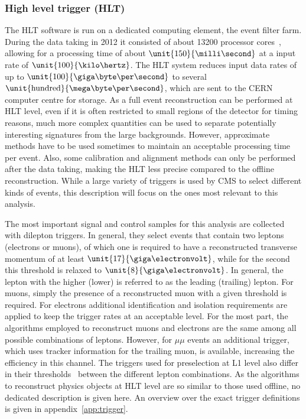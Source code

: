 \subsubsection*{High level trigger (HLT)}
The HLT software is run on a dedicated computing element, the event filter farm. During the data taking in 2012 it consisted of about 13200 processor cores~\cite{HLTProceedings}, allowing for a processing time of about $\unit{150}{\milli\second}$ at a input rate of $\unit{100}{\kilo\hertz}$. The HLT system reduces input data rates of up to $\unit{100}{\giga\byte\per\second}$ to several $\unit{\text{hundred}}{\mega\byte\per\second}$, which are sent to the CERN computer centre for storage. As a full event reconstruction can be performed at HLT level, even if it is often restricted to small regions of the detector for timing reasons, much more complex quantities can be used to separate potentially interesting signatures from the large backgrounds. However, approximate methods have to be used sometimes to maintain an acceptable processing time per event. Also, some calibration and alignment methods can only be performed after the data taking, making the HLT less precise compared to the offline reconstruction. While a large variety of triggers is used by CMS to select different kinds of events, this description will focus on the ones most relevant to this analysis. 

The most important signal and control samples for this analysis are collected with dilepton triggers. In general, they select events that contain two leptons (electrons or muons), of which one is required to have a reconstructed transverse momentum \pt of at least $\unit{17}{\giga\electronvolt}$, while for the second this threshold is relaxed to $\unit{8}{\giga\electronvolt}$. In general, the lepton with the higher (lower) \pt is referred to as the leading (trailing) lepton.  For muons, simply the presence of a reconstructed muon with a given \pt threshold is required. For electrons additional identification and isolation requirements are applied to keep the trigger rates at an acceptable level. For the most part, the algorithms employed to reconstruct muons and electrons are the same among all possible combinations of leptons. However, for $\mu\mu$ events an additional trigger, which uses tracker information for the trailing muon, is available, increasing the efficiency in this channel. The triggers used for preselection at L1 level also differ in their thresholds~\cite{HLTConfigBrowser} between the different lepton combinations. As the algorithms to reconstruct physics objects at HLT level are so similar to those used offline, no dedicated description is given here. An overview over the exact trigger definitions is given in appendix~\ref{app:trigger}.

